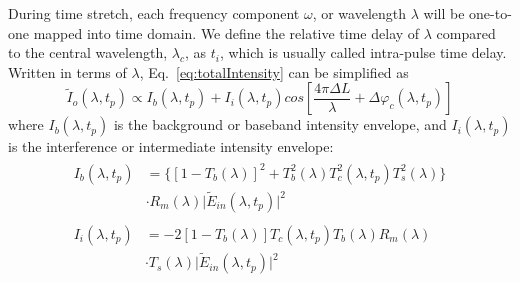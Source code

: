 \documentclass[aps,pra,reprint,superscriptaddress]{revtex4-1}
\begin{document}
During time stretch, each frequency component $\omega$, or wavelength $\lambda$ will be one-to-one mapped into time domain. We define the relative time delay of $\lambda$ compared to the central wavelength, $\lambda_c$, as $t_i$, which is usually called intra-pulse time delay. Written in terms of $\lambda$, Eq.~\ref{eq:totalIntensity} can be simplified as
\begin{equation} \label{eq:totalIntensitylambda}
\tilde{I}_o(\lambda, t_p) \propto I_b (\lambda, t_p) + I_i (\lambda, t_p) cos[ \frac{4\pi\Delta L}{\lambda} + \Delta \varphi_c(\lambda, t_p) ]
\end{equation}
where $I_b (\lambda, t_p)$ is the background or baseband intensity envelope, and $I_i (\lambda, t_p)$ is the interference or intermediate intensity envelope:
\begin{align}
\begin{split} \label{eq:backgroundIntensity}
I_b (\lambda, t_p) &= \Big\lbrace [1-T_b(\lambda)]^2 + T_b^2(\lambda) T_c^2(\lambda, t_p) T_s^2(\lambda) \Big\rbrace \\
&\cdot R_m(\lambda) \lvert \tilde{E}_{in}(\lambda, t_p)\rvert^2
\end{split}\\
\begin{split} \label{eq:interferenceIntensity}
I_i (\lambda, t_p) &= - 2 [1-T_b(\lambda)] T_c(\lambda, t_p) T_b(\lambda) R_m(\lambda)\\
& \cdot T_s(\lambda) \lvert \tilde{E}_{in}(\lambda, t_p)\rvert^2
\end{split}
\end{align}
\end{document}
